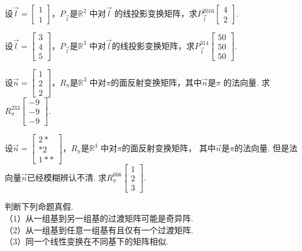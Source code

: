 \begin{ex}\label{8.12}
设$\vec{l}=\begin{bmatrix}1\\1\end{bmatrix}$，$P_{\vec{l}}$是$\mathbb{R}^2$ 中对$\vec{l}$ 的线投影变换矩阵，求$P_{\vec{l}}^{2016}\begin{bmatrix}4\\2\end{bmatrix}$.
\end{ex}

\begin{ex}\label{8.13}
设$\vec{l}=\begin{bmatrix}3\\4\\5\end{bmatrix}$，$P_{\vec{l}}$是$\mathbb{R}^3$ 中对$\vec{l}$的线投影变换矩阵，求$P_{\vec{l}}^{314}\begin{bmatrix}50\\50\\50\end{bmatrix}$.
\end{ex}

\begin{ex}\label{8.14}
设$\vec{n}=\begin{bmatrix}1\\2\\2\end{bmatrix}$，$R_{\pi}$是$\mathbb{R}^3$ 中对$\pi$的面反射变换矩阵，其中$\vec{n}$是$\pi$ 的法向量.
求$R_{\pi}^{233}\begin{bmatrix}-9\\-9\\-9\end{bmatrix}$.
\end{ex}

\begin{ex}\label{8.15}
设$\vec{n}=\begin{bmatrix}2*\\*2\\1**\end{bmatrix}$，$R_\pi$是$\mathbb{R}^3$ 中对$\pi$的面反射变换矩阵，
其中$\vec{n}$是$\pi$的法向量. 但是法向量$\vec{n}$已经模糊辨认不清. 求$R_{\pi}^{666}\begin{bmatrix}1\\2\\3\end{bmatrix}$.
\end{ex}

\begin{ex}\label{8.16}
判断下列命题真假.\\
（1）从一组基到另一组基的过渡矩阵可能是奇异阵.\\
（2）从一组基到任意一组基有且仅有一个过渡矩阵.\\
（3）同一个线性变换在不同基下的矩阵相似.
\end{ex}

